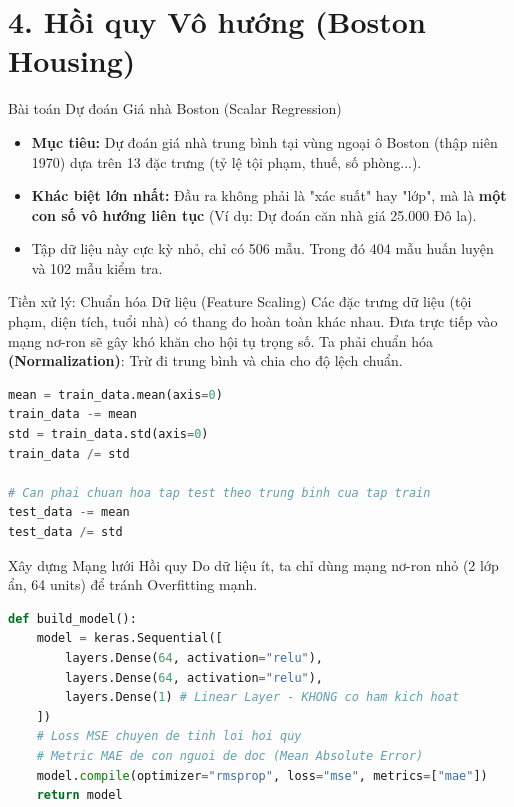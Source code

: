 \documentclass[aspectratio=169]{beamer}
\begin{document}
\section{4. Hồi quy Vô hướng (Boston Housing)}

\begin{frame}{Bài toán Dự đoán Giá nhà Boston (Scalar Regression)}
    \begin{itemize}
        \item \textbf{Mục tiêu:} Dự đoán giá nhà trung bình tại vùng ngoại ô Boston (thập niên 1970) dựa trên 13 đặc trưng (tỷ lệ tội phạm, thuế, số phòng...).
        \item \textbf{Khác biệt lớn nhất:} Đầu ra không phải là "xác suất" hay "lớp", mà là \textbf{một con số vô hướng liên tục} (Ví dụ: Dự đoán căn nhà giá 25.000 Đô la). 
        \item Tập dữ liệu này cực kỳ nhỏ, chỉ có 506 mẫu. Trong đó 404 mẫu huấn luyện và 102 mẫu kiểm tra.
    \end{itemize}
\end{frame}

\begin{frame}[fragile]{Tiền xử lý: Chuẩn hóa Dữ liệu (Feature Scaling)}
    Các đặc trưng dữ liệu (tội phạm, diện tích, tuổi nhà) có thang đo hoàn toàn khác nhau. Đưa trực tiếp vào mạng nơ-ron sẽ gây khó khăn cho hội tụ trọng số. Ta phải chuẩn hóa \textbf{(Normalization)}: Trừ đi trung bình và chia cho độ lệch chuẩn.
\begin{lstlisting}[language=Python]
mean = train_data.mean(axis=0)
train_data -= mean
std = train_data.std(axis=0)
train_data /= std

# Can phai chuan hoa tap test theo trung binh cua tap train
test_data -= mean
test_data /= std
\end{lstlisting}
\end{frame}

\begin{frame}[fragile]{Xây dựng Mạng lưới Hồi quy}
    Do dữ liệu ít, ta chỉ dùng mạng nơ-ron nhỏ (2 lớp ẩn, 64 units) để tránh Overfitting mạnh.
\begin{lstlisting}[language=Python]
def build_model():
    model = keras.Sequential([
        layers.Dense(64, activation="relu"),
        layers.Dense(64, activation="relu"),
        layers.Dense(1) # Linear Layer - KHONG co ham kich hoat
    ])
    # Loss MSE chuyen de tinh loi hoi quy
    # Metric MAE de con nguoi de doc (Mean Absolute Error)
    model.compile(optimizer="rmsprop", loss="mse", metrics=["mae"])
    return model
\end{lstlisting}
\end{frame}
\end{document}
